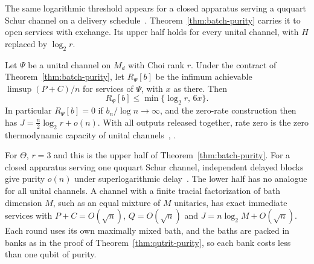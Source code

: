 The same logarithmic threshold appears for a closed apparatus serving a
ququart Schur channel on a delivery schedule~\cite[Theorems~7 and~8]{DouglasSchur}.
Theorem~\ref{thm:batch-purity} carries it to open services with exchange.
Its upper half holds for every unital channel, with $H$ replaced by $\log_2r$.

\begin{theorem}\label{thm:unital-batch}
Let $\Psi$ be a unital channel on $M_d$ with Choi rank $r$. Under the
contract of Theorem~\ref{thm:batch-purity}, let $R_\Psi[b]$ be the
infimum achievable $\limsup(P+C)/n$ for services of $\Psi$, with $x$ as
there. Then
\[
 R_\Psi[b]\leq\min\{\log_2r,\,6x\}.
\]
In particular $R_\Psi[b]=0$ if $b_n/\log n\to\infty$, and the
zero-rate construction then has $J=\tfrac n2\log_2r+o(n)$. With all
outputs released together, rate zero is the zero thermodynamic capacity
of unital channels~\cite{FaistBertaBrandao2019},
\cite[Equation~(4.9) and Theorem~7.1]{FaistBertaBrandao2021}.
\end{theorem}

For $\Theta$, $r=3$ and this is the upper half of
Theorem~\ref{thm:batch-purity}. For a closed apparatus serving one
ququart Schur channel, independent delayed blocks give purity $o(n)$
under superlogarithmic delay~\cite[Theorem~8]{DouglasSchur}. The lower
half has no analogue for all unital channels. A channel with a finite
tracial factorization of bath dimension $M$, such as an equal mixture of
$M$ unitaries, has exact immediate services with $P+C=O(\sqrt n)$,
$Q=O(\sqrt n)$ and $J=n\log_2M+O(\sqrt n)$. Each round uses its own
maximally mixed bath, and the baths are packed in banks as in the proof
of Theorem~\ref{thm:qutrit-purity}, so each bank costs less than one
qubit of purity.
